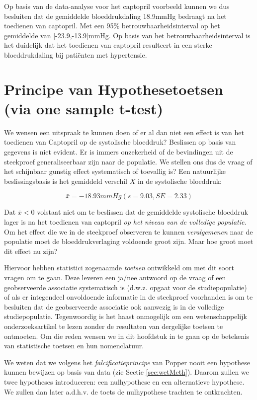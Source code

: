 \documentclass[
  12pt,dutch,coursenotes]{book}
\theoremstyle{definition}
\theoremstyle{definition}
\theoremstyle{definition}
\theoremstyle{remark}
\begin{document}
Op basis van de data-analyse voor het captopril voorbeeld kunnen we dus besluiten dat de gemiddelde bloeddrukdaling
18.9mmHg bedraagt na het toedienen van captopril. Met een 95\% betrouwbaarheidsinterval op het gemiddelde van {[}-23.9,-13.9{]}mmHg.
Op basis van het betrouwbaarheidsinterval is het duidelijk dat het toedienen van captopril resulteert in een sterke bloeddrukdaling bij patiënten met hypertensie.

\hypertarget{principe-van-hypothesetoetsen-via-one-sample-t-test}{%
\section{Principe van Hypothesetoetsen (via one sample t-test)}\label{principe-van-hypothesetoetsen-via-one-sample-t-test}}

We wensen een uitspraak te kunnen doen of er al dan niet een effect is van het toedienen van Captopril op de systolische bloeddruk? Beslissen op basis van gegevens is niet evident. Er is immers onzekerheid of de bevindingen uit de steekproef
generaliseerbaar zijn naar de populatie. We stellen ons dus de vraag of het schijnbaar gunstig effect systematisch of toevallig is?
Een natuurlijke beslissingsbasis is het gemiddeld verschil \(X\) in de systolische bloeddruk:

\[\bar x=-18.93mmHg (s = 9.03, SE = 2.33)\]

Dat \(\bar{x}< 0\) volstaat niet om te beslissen dat de gemiddelde systolische bloeddruk lager is na het toedienen van captopril \emph{op het niveau van de volledige populatie}. Om het effect die we in de steekproef observeren te kunnen \emph{veralgemenen} naar de populatie moet de bloeddrukverlaging voldoende groot zijn. Maar hoe groot moet dit effect nu zijn?

Hiervoor hebben statistici zogenaamde \emph{toetsen} ontwikkeld om met dit soort vragen om te gaan. Deze leveren een ja/nee antwoord op de vraag of een geobserveerde associatie systematisch is (d.w.z. opgaat voor de studiepopulatie) of als er integendeel onvoldoende informatie in de steekproef voorhanden is om te besluiten dat de geobserveerde associatie ook aanwezig is in de volledige studiepopulatie. Tegenwoordig is het
haast onmogelijk om een wetenschappelijk onderzoeksartikel te lezen zonder
de resultaten van dergelijke toetsen te ontmoeten. Om die reden wensen we in
dit hoofdstuk in te gaan op de betekenis van statistische toetsen en hun
nomenclatuur.

We weten dat we volgens het \emph{falcificatieprincipe} van Popper nooit een hypothese kunnen bewijzen op basis van data (zie Sectie \ref{sec:wetMeth}).
Daarom zullen we twee hypotheses introduceren: een nulhypothese en een alternatieve hypothese.
We zullen dan later a.d.h.v. de toets de nulhypothese trachten te ontkrachten.
\end{document}

